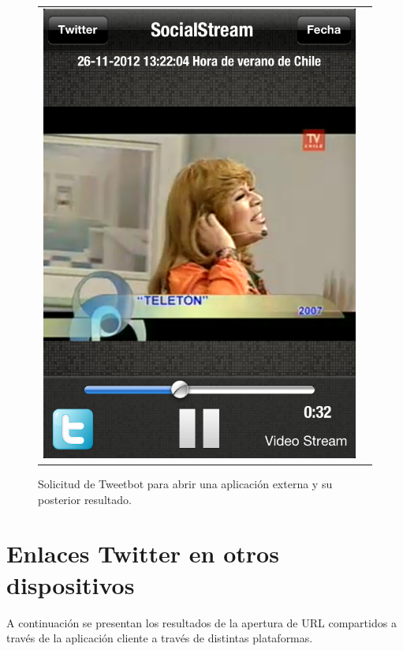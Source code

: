 \begin{figure}[H]
\begin{tabular}{cc}
	\includegraphics[scale=0.3]{imgs/tweetbot-appopened.png} \\
	\end{tabular}
	\caption{Solicitud de Tweetbot para abrir una aplicación externa y su posterior resultado.}
	\label{fig:tweetbot-sstream}
\end{figure}

\section{Enlaces Twitter en otros dispositivos}
A continuación se presentan los resultados de la apertura de URL compartidos a través de la aplicación cliente a través de distintas plataformas.
	
